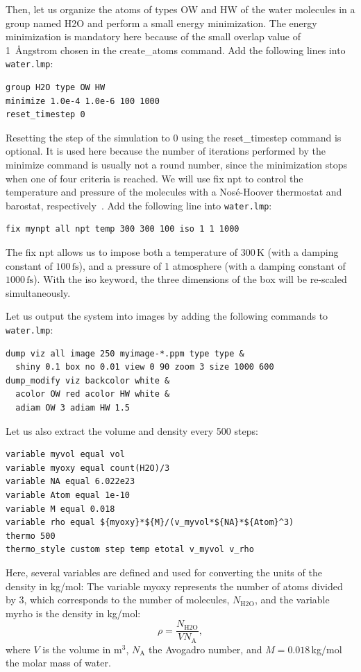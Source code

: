 \documentclass[9pt,tutorial]{livecoms}
\newcommand{\lmpcmd}[1]{\hspace{0pt}\colorbox{listing}{\textcolor{command}{\small{#1}}}\hspace{0pt}} %
\newcommand{\flecmd}[1]{\textcolor{command}{\texttt{#1}}} %
\begin{document}
Then, let us organize the atoms of types OW and HW of the water molecules in a
group named \lmpcmd{H2O} and perform a small energy minimization.  The energy
minimization is mandatory here because of the small \lmpcmd{overlap} value
of 1~Ångstrom chosen in the \lmpcmd{create\_atoms} command.  Add the following lines into \flecmd{water.lmp}:
\begin{lstlisting}
group H2O type OW HW
minimize 1.0e-4 1.0e-6 100 1000
reset_timestep 0
\end{lstlisting}
Resetting the step of the simulation to 0 using the
\lmpcmd{reset\_timestep} command is optional.
It is used here because the number of iterations performed by the \lmpcmd{minimize}
command is usually not a round number, since the minimization stops when one of
four criteria is reached.  We will use \lmpcmd{fix npt} to control the temperature
and pressure of the molecules with a Nosé-Hoover thermostat and barostat,
respectively~\cite{nose1984unified, hoover1985canonical, martyna1994constant}.
Add the following line into \flecmd{water.lmp}:
\begin{lstlisting}
fix mynpt all npt temp 300 300 100 iso 1 1 1000
\end{lstlisting}
The \lmpcmd{fix npt} allows us to impose both a temperature of $300\,\text{K}$
(with a damping constant of $100\,\text{fs}$), and a pressure of 1 atmosphere
(with a damping constant of $1000\,\text{fs}$).  With the \lmpcmd{iso} keyword,
the three dimensions of the box will be re-scaled simultaneously.

Let us output the system into images by adding the following commands to \flecmd{water.lmp}:
\begin{lstlisting}
dump viz all image 250 myimage-*.ppm type type &
  shiny 0.1 box no 0.01 view 0 90 zoom 3 size 1000 600
dump_modify viz backcolor white &
  acolor OW red acolor HW white &
  adiam OW 3 adiam HW 1.5
\end{lstlisting}
Let us also extract the volume and density every 500 steps:
\begin{lstlisting}
variable myvol equal vol
variable myoxy equal count(H2O)/3
variable NA equal 6.022e23
variable Atom equal 1e-10
variable M equal 0.018
variable rho equal ${myoxy}*${M}/(v_myvol*${NA}*${Atom}^3)
thermo 500
thermo_style custom step temp etotal v_myvol v_rho
\end{lstlisting}
Here, several variables are defined and used for converting the units of the
density in kg/mol:  The variable \lmpcmd{myoxy} represents the number of
atoms divided by 3,  which corresponds to the number of molecules, $N_\text{H2O}$,
and the variable \lmpcmd{myrho} is the density in kg/mol:
\begin{equation}
\rho = \dfrac{N_\text{H2O}}{V N_\text{A}},
\end{equation}
where $V$ is the volume in m$^3$, $N_\text{A}$ the Avogadro number, and
$M = 0.018$\,kg/mol the molar mass of water.
\end{document}
